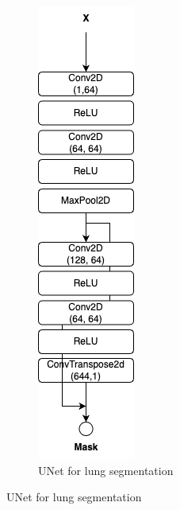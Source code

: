 \begin{figure}[htbp]
\begin{subfigure}{0.2\linewidth}
        \label{fig:age_model}
    \end{subfigure}
    \begin{subfigure}{0.1\linewidth}
        \centering
        \includegraphics[width=\linewidth]{images/UNet.png}
        \caption{UNet for lung segmentation}
        \label{fig:unet_lung}
    \end{subfigure}
    
\end{figure}
